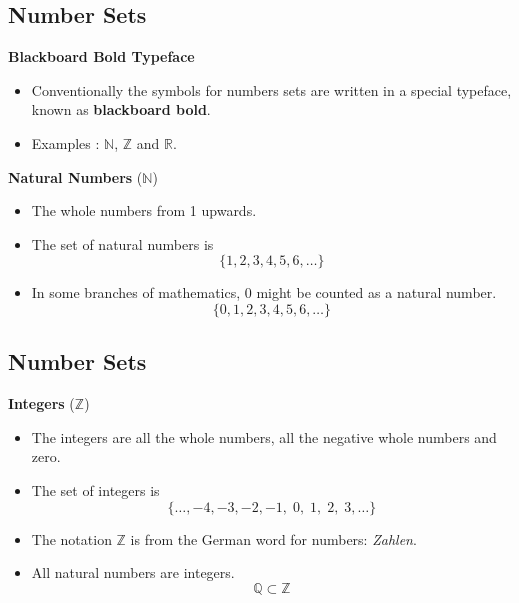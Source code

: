\documentclass[11pt,a4paper,titlepage,oneside,openany]{article}
\numberwithin{equation}{section}
\numberwithin{algorithm}{section}
\numberwithin{figure}{section}
\numberwithin{table}{section}
\begin{document}
{%

\subsection{Number Sets}

\textbf{Blackboard Bold Typeface}

\begin{itemize}
\item Conventionally the symbols for numbers sets are written in a special typeface, known as \textbf{blackboard bold}.
\item Examples : $\mathbb{N}$, $\mathbb{Z}$ and $\mathbb{R}$.

\end{itemize}


\textbf{Natural Numbers} ($\mathbb{N}$)
\begin{itemize}
\item The whole numbers from 1 upwards. 

\item The set of natural numbers is 
\[\{1,2,3,4,5,6,\ldots\} \]
\item In some branches of mathematics, $0$ might be counted as a natural number.
\[\{0,1,2,3,4,5,6,\ldots\} \]
\end{itemize}



\subsection{Number Sets}


\textbf{Integers} ($\mathbb{Z}$)
\begin{itemize}
\item The integers are all the whole numbers, all the negative whole numbers and zero.

\item The set of integers is 
\[\{\ldots,-4,-3,-2,-1,\;0,\;1,\;2,\;3,\ldots\} \]
\item The notation $\mathbb{Z}$ is from the German word for numbers: \textit{Zahlen}. 
\item All natural numbers are integers.
\[ \mathbb{Q}  \subset \mathbb{Z}\]
\end{itemize}

}
\end{document}
